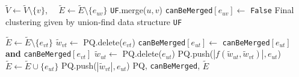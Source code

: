 \begin{algorithm}
\begin{algorithmic}[1]
          \State $\tilde{V} \gets \tilde{V} \setminus \{ v\}$, $\quad \tilde{E} \gets \tilde{E} \setminus \{ e_{uv}\}$ 
          \State \texttt{UF}.merge($u,v$) 
          \State \texttt{canBeMerged}$[e_{uv}] \gets$ \texttt{False} 
        \EndIf
      \EndWhile
      \State
      \Return Final clustering given by union-find data structure  \texttt{UF}
  \end{algorithmic}
  \hspace*{1.5cm} 
    \begin{algorithmic}[1]
       
        \State $\tilde{E} \gets \tilde{E} \setminus \{e_{vt}\}$
        \State $\tilde{w}_{vt} \gets$ PQ.delete($e_{vt}$) 
        \State \texttt{canBeMerged}$[e_{ut}] \gets$ \texttt{canBeMerged}$[e_{ut}]$ \textbf{and} \texttt{canBeMerged}$[e_{vt}]$
          \State $\tilde{w}_{ut} \gets$ PQ.delete($e_{ut}$)  
          \State PQ.push($ |f(\tilde{w}_{ut}, \tilde{w}_{vt})|, e_{ut}$) 
        \Else
          \State $\tilde{E} \gets \tilde{E} \cup \{e_{ut}\}$
          \State PQ.push($ |\tilde{w}_{vt}|, e_{ut}$) 
        \EndIf
      \EndFor
      \State
      \Return PQ, \texttt{canBeMerged}, $\tilde{E}$
    \EndFunction
  \end{algorithmic}
  \label{detailed_alg}
\end{algorithm}
